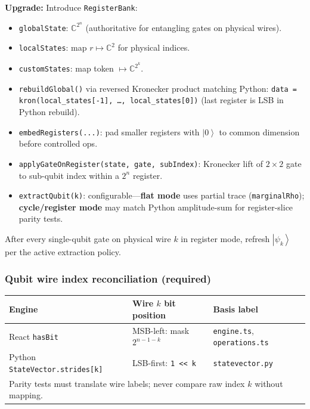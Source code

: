 \documentclass[11pt,a4paper]{article}
\newcommand{\C}{\mathbb{C}}
\newcommand{\ket}[1]{\left|#1\right\rangle}
\begin{document}
\textbf{Upgrade:} Introduce \texttt{RegisterBank}:
\begin{itemize}
  \item \texttt{globalState}: $\C^{2^n}$ (authoritative for entangling gates on physical wires).
  \item \texttt{localStates}: map $r\mapsto\C^{2}$ for physical indices.
  \item \texttt{customStates}: map token $\mapsto\C^{2^k}$.
  \item \texttt{rebuildGlobal()} via reversed Kronecker product matching Python:
        \texttt{data = kron(local\_states[-1], \ldots, local\_states[0])} (last register is LSB in Python rebuild).
  \item \texttt{embedRegisters(...)}: pad smaller registers with $\ket{0}$ to common dimension before controlled ops.
  \item \texttt{applyGateOnRegister(state, gate, subIndex)}: Kronecker lift of $2\times2$ gate to sub-qubit index within a $2^n$ register.
  \item \texttt{extractQubit(k)}: configurable---\textbf{flat mode} uses partial trace (\texttt{marginalRho}); \textbf{cycle/register mode} may match Python amplitude-sum for register-slice parity tests.
\end{itemize}

After every single-qubit gate on physical wire $k$ in register mode, refresh $\ket{\psi_k}$ per the active extraction policy.

\subsubsection{Qubit wire index reconciliation (required)}

\begin{center}
\small
\begin{tabular}{@{}lll@{}}
\toprule
Engine & Wire $k$ bit position & Basis label \\
\midrule
React \texttt{hasBit} & MSB-left: mask $2^{n-1-k}$ & \texttt{engine.ts}, \texttt{operations.ts} \\
Python \texttt{StateVector.strides[k]} & LSB-first: \texttt{1 << k} & \texttt{statevector.py} \\
\midrule
\multicolumn{3}{l}{Parity tests must translate wire labels; never compare raw index $k$ without mapping.} \\
\bottomrule
\end{tabular}
\end{center}
\end{document}
